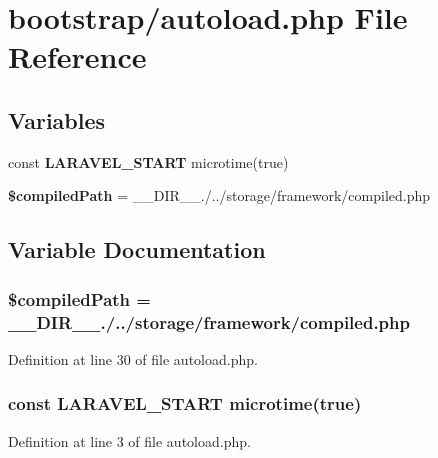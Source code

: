 \section{bootstrap/autoload.php File Reference}
\label{bootstrap_2autoload_8php}
\subsection*{Variables}
\begin{DoxyCompactItemize}
\item 
const {\bf L\+A\+R\+A\+V\+E\+L\+\_\+\+S\+T\+A\+R\+T} microtime(true)
\item 
{\bf \$compiled\+Path} = \+\_\+\+\_\+\+D\+I\+R\+\_\+\+\_\+.\textquotesingle{}/../storage/framework/compiled.\+php\textquotesingle{}
\end{DoxyCompactItemize}


\subsection{Variable Documentation}
\subsubsection[{\$compiled\+Path}]{\setlength{\rightskip}{0pt plus 5cm}\$compiled\+Path = \+\_\+\+\_\+\+D\+I\+R\+\_\+\+\_\+.\textquotesingle{}/../storage/framework/compiled.\+php\textquotesingle{}}\label{bootstrap_2autoload_8php_a39023bce53a5e7276a735f8223c748d3}


Definition at line 30 of file autoload.\+php.

\subsubsection[{L\+A\+R\+A\+V\+E\+L\+\_\+\+S\+T\+A\+R\+T}]{\setlength{\rightskip}{0pt plus 5cm}const L\+A\+R\+A\+V\+E\+L\+\_\+\+S\+T\+A\+R\+T microtime(true)}\label{bootstrap_2autoload_8php_a3904d6331aed7d48e576702946b2f47c}


Definition at line 3 of file autoload.\+php.

